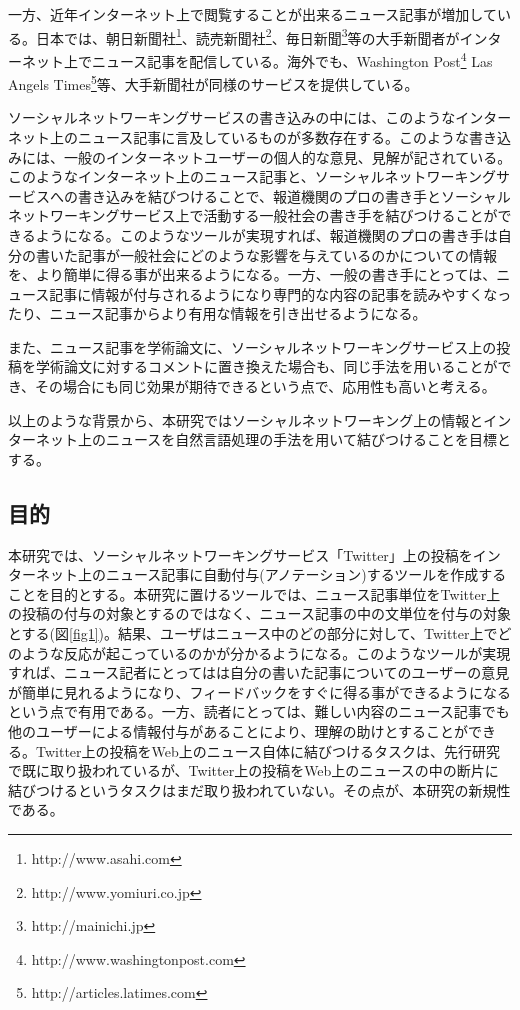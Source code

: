 \documentclass[12pt]{jarticle}
\begin{document}
一方、近年インターネット上で閲覧することが出来るニュース記事が増加している。日本では、朝日新聞社\footnote{http://www.asahi.com}、読売新聞社\footnote{http://www.yomiuri.co.jp}、毎日新聞\footnote{http://mainichi.jp}等の大手新聞者がインターネット上でニュース記事を配信している。海外でも、Washington Post\footnote{http://www.washingtonpost.com} Las Angels Times\footnote{http://articles.latimes.com}等、大手新聞社が同様のサービスを提供している。

ソーシャルネットワーキングサービスの書き込みの中には、このようなインターネット上のニュース記事に言及しているものが多数存在する。このような書き込みには、一般のインターネットユーザーの個人的な意見、見解が記されている。このようなインターネット上のニュース記事と、ソーシャルネットワーキングサービスへの書き込みを結びつけることで、報道機関のプロの書き手とソーシャルネットワーキングサービス上で活動する一般社会の書き手を結びつけることができるようになる。このようなツールが実現すれば、報道機関のプロの書き手は自分の書いた記事が一般社会にどのような影響を与えているのかについての情報を、より簡単に得る事が出来るようになる。一方、一般の書き手にとっては、ニュース記事に情報が付与されるようになり専門的な内容の記事を読みやすくなったり、ニュース記事からより有用な情報を引き出せるようになる。

また、ニュース記事を学術論文に、ソーシャルネットワーキングサービス上の投稿を学術論文に対するコメントに置き換えた場合も、同じ手法を用いることができ、その場合にも同じ効果が期待できるという点で、応用性も高いと考える。

以上のような背景から、本研究ではソーシャルネットワーキング上の情報とインターネット上のニュースを自然言語処理の手法を用いて結びつけることを目標とする。

\newpage

\subsection{目的}
本研究では、ソーシャルネットワーキングサービス「Twitter」上の投稿をインターネット上のニュース記事に自動付与(アノテーション)するツールを作成することを目的とする。本研究に置けるツールでは、ニュース記事単位をTwitter上の投稿の付与の対象とするのではなく、ニュース記事の中の文単位を付与の対象とする(図\ref{fig1})。結果、ユーザはニュース中のどの部分に対して、Twitter上でどのような反応が起こっているのかが分かるようになる。このようなツールが実現すれば、ニュース記者にとってはは自分の書いた記事についてのユーザーの意見が簡単に見れるようになり、フィードバックをすぐに得る事ができるようになるという点で有用である。一方、読者にとっては、難しい内容のニュース記事でも他のユーザーによる情報付与があることにより、理解の助けとすることができる。Twitter上の投稿をWeb上のニュース自体に結びつけるタスクは、先行研究で既に取り扱われているが、Twitter上の投稿をWeb上のニュースの中の断片に結びつけるというタスクはまだ取り扱われていない。その点が、本研究の新規性である。
\end{document}
